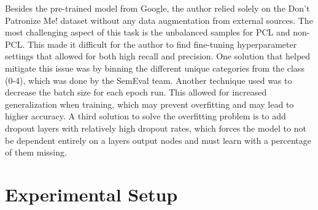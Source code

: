 \documentclass[11pt,a4paper]{article}
\begin{document}
Besides the pre-trained model from Google, the author relied solely on the Don't Patronize Me! dataset without any data augmentation from external sources. The most challenging aspect of this task is the unbalanced samples for PCL and non-PCL. This made it difficult for the author to find fine-tuning hyperparameter settings that allowed for both high recall and precision. One solution that helped mitigate this issue was by binning the different unique categories from the class (0-4), which was done by the SemEval team. Another technique used was to decrease the batch size for each epoch run. This allowed for increased generalization when training, which may prevent overfitting and may lead to higher accuracy. A third solution to solve the overfitting problem is to add dropout layers with relatively high dropout rates, which forces the model to not be dependent entirely on a layers output nodes and must learn with a percentage of them missing.






\section{Experimental Setup}




\end{document}
